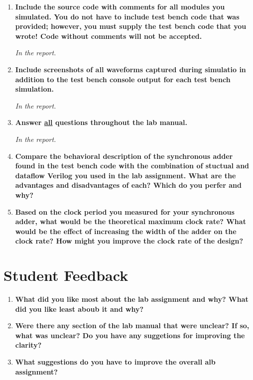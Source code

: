 \documentclass[a4paper,12pt]{article}
\begin{document}
\begin{enumerate}
  \item \textbf{Include the source code with comments for all modules you
    simulated. You do not have to include test bench code that was
    provided; however, you must supply the test bench code that you wrote! Code
    without comments will not be accepted.}

    \textit{In the report.}

  \item \textbf{Include screenshots of all waveforms captured during simulatio in addition
    to the test bench console output for each test bench simulation.}

    \textit{In the report.}

  \item \textbf{Answer \underline{all} questions throughout the lab manual.}

    \textit{In the report.}

  \item \textbf{Compare the behavioral description of the synchronous adder found in the
    test bench code with the combination of stuctual and dataflow Verilog you
    used in the lab assignment. What are the advantages and disadvantages of each?
    Which do you perfer and why?}

  \item \textbf{Based on the clock period you measured for your synchronous adder, what
    would be the theoretical maximum clock rate? What would be the effect of
    increasing the width of the adder on the clock rate? How might you improve the
    clock rate of the design?}
\end{enumerate}

\section*{Student Feedback}

\begin{enumerate}
  \item \textbf{What did you like most about the lab assignment and why? What did you like least aboub it and why?}
  \vspace{10pt}

  \item \textbf{Were there any section of the lab manual that were unclear? If so, what was unclear? Do you have any suggetions for improving the clarity?}
  \vspace{10pt}

  \item \textbf{What suggestions do you have to improve the overall alb assignment?}
  \vspace{10pt}

\end{enumerate}
\end{document}
